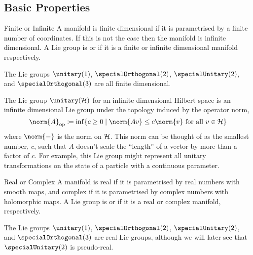 \subsection{Basic Properties}
\begin{dfn}{Finite or Infinite}{}
    A manifold is finite dimensional if it is parametrised by a finite number of coordinates.
    If this is not the case then the manifold is infinite dimensional.
    A Lie group is  or  if it is a finite or infinite dimensional manifold respectively.
\end{dfn}
\begin{exm}{}{}
    The Lie groups \(\unitary(1)\), \(\specialOrthogonal(2)\), \(\specialUnitary(2)\), and \(\specialOrthogonal(3)\) are all finite dimensional.
    
    The Lie group \(\unitary(\hilbert)\) for an infinite dimensional Hilbert space is an infinite dimensional Lie group under the topology induced by the operator norm,
    \begin{equation}
        \norm{A}_{\mathrm{op}} \coloneqq \inf \{c \ge 0 \mid \norm{Av} \le c\norm{v} \text{ for all } v \in \hilbert\}
    \end{equation}
    where \(\norm{-}\) is the norm on \(\mathcal{H}\).
    This norm can be thought of as the smallest number, \(c\), such that \(A\) doesn't scale the \enquote{length} of a vector by more than a factor of \(c\).
    For example, this Lie group might represent all unitary transformations on the state of a particle with a continuous parameter.
\end{exm}

\begin{dfn}{Real or Complex}{}
    A manifold is real if it is parametrised by real numbers with smooth maps, and complex if it is parametrised by complex numbers with holomorphic maps.
    A Lie group is  or  if it is a real or complex manifold, respectively.
\end{dfn}

\begin{dfn}{}{}
    The Lie groups \(\unitary(1)\), \(\specialOrthogonal(2)\), \(\specialUnitary(2)\), and \(\specialOrthogonal(3)\) are real Lie groups, although we will later see that \(\specialUnitary(2)\) is pseudo-real.
\end{dfn}

